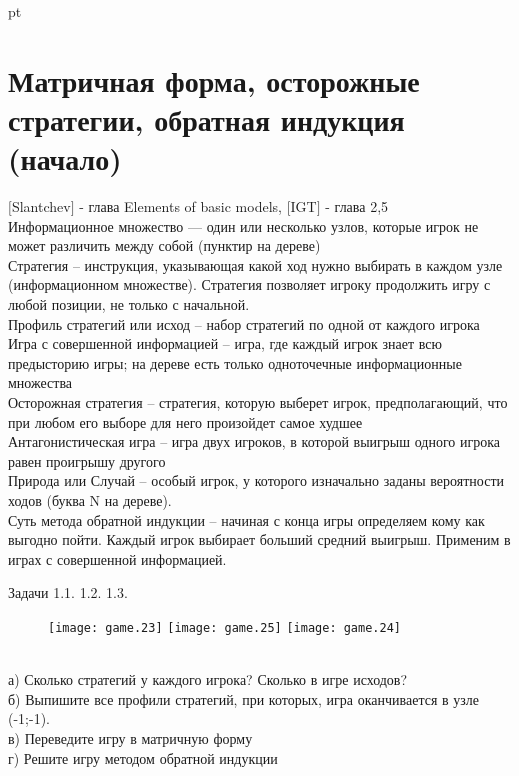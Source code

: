 \documentclass[pdftex,12pt,a4paper]{article}
\begin{document}
 pt %




\section{Матричная форма, осторожные стратегии, обратная индукция (начало)}

$[$Slantchev$]$ - глава Elements of basic models, $[$IGT$]$ - глава 2,5 \\

\small
Информационное множество --- один или несколько узлов, которые игрок не может различить между собой (пунктир на дереве) \\
Стратегия -- инструкция, указывающая какой ход нужно выбирать в каждом узле (информационном множестве). Стратегия позволяет игроку продолжить игру с любой позиции, не только с начальной. \\
Профиль стратегий или исход -- набор стратегий по одной от каждого игрока \\
Игра с совершенной информацией -- игра, где каждый игрок знает всю предысторию игры;  на дереве есть только одноточечные информационные множества\\
Осторожная стратегия -- стратегия, которую выберет игрок, предполагающий, что при любом его выборе для него произойдет самое худшее\\
Антагонистическая игра -- игра двух игроков, в которой выигрыш одного игрока равен проигрышу другого\\
Природа или Случай -- особый игрок, у которого изначально заданы вероятности ходов (буква N на дереве).\\
Суть метода обратной индукции -- начиная с конца игры определяем кому как выгодно пойти. Каждый игрок выбирает больший средний выигрыш. Применим в играх с совершенной информацией. \\
\normalsize

Задачи 1.1.	1.2.	1.3. 
\begin{figure}[!htbp]
    \texttt{[image: game.23]}
    \texttt{[image: game.25]}
    \texttt{[image: game.24]}
\end{figure} \\
а) Сколько стратегий у каждого игрока? Сколько в игре исходов?\\
б) Выпишите все профили стратегий, при которых, игра оканчивается в узле (-1;-1).\\
в) Переведите игру в матричную форму\\
г) Решите игру методом обратной индукции \\
\end{document}
